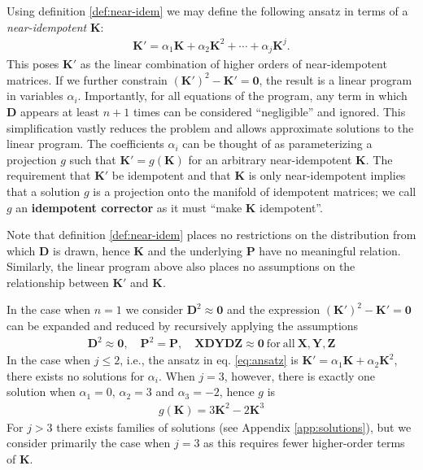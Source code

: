 \documentclass{article}
\theoremstyle{plain}
\theoremstyle{definition}
\theoremstyle{remark}
\newcommand{\vD}{\mathbf{D}}
\newcommand{\vK}{\mathbf{K}}
\newcommand{\vP}{\mathbf{P}}
\newcommand{\vX}{\mathbf{X}}
\newcommand{\vY}{\mathbf{Y}}
\newcommand{\vZ}{\mathbf{Z}}
\begin{document}
Using definition \ref{def:near-idem} we may define the following ansatz in terms of a \textit{near-idempotent} $\vK$:
%
\begin{align}
    \vK' = \alpha_1 \vK + \alpha_2 \vK^2 + \cdots + \alpha_j \vK^j.
    \label{eq:ansatz}
\end{align}
%
This poses $\vK'$ as the linear combination of higher orders of near-idempotent matrices. If we further constrain $(\vK')^2 - \vK' = \bm{0}$, the result is a linear program in variables $\alpha_i$. Importantly, for all equations of the program, any term in which $\vD$ appears at least $n+1$ times can be considered ``negligible'' and ignored. This simplification vastly reduces the problem and allows approximate solutions to the linear program. The coefficients $\alpha_i$ can be thought of as parameterizing a projection $g$ such that $\vK' = g(\vK)$ for an arbitrary near-idempotent $\vK$. The requirement that $\vK'$ be idempotent and that $\vK$ is only near-idempotent implies that a solution $g$ is a projection onto the manifold of idempotent matrices; we call $g$ an \textbf{idempotent corrector} as it must ``make $\vK$ idempotent''.

Note that definition \ref{def:near-idem} places no restrictions on the distribution from which $\vD$ is drawn, hence $\vK$ and the underlying $\vP$ have no meaningful relation. Similarly, the linear program above also places no assumptions on the relationship between $\vK'$ and $\vK$.

In the case when $n=1$ we consider $\vD^2 \approx \bm{0}$ and the expression $(\vK')^2 - \vK' = \bm{0}$ can be expanded and reduced by recursively applying the assumptions
%
\begin{align*}
    \vD^2 \approx \bm{0}, \quad \vP^2 = \vP, \quad \vX \vD \vY \vD \vZ \approx \bm{0} \mathrm{~for~all~} \vX,\vY,\vZ
\end{align*}
%
In the case when $j\leq2$, i.e., the ansatz in eq. \ref{eq:ansatz} is $\vK' = \alpha_1 \vK + \alpha_2 \vK^2$, there exists no solutions for $\alpha_i$. When $j=3$, however, there is exactly one solution when $\alpha_1 = 0$, $\alpha_2 = 3$ and $\alpha_3 = -2$, hence $g$ is
%
\begin{align}
    g(\vK) = 3\vK^2 - 2 \vK^3
    \label{eq:}
\end{align}
%
For $j>3$ there exists families of solutions (see Appendix \ref{app:solutions}), but we consider primarily the case when $j=3$ as this requires fewer higher-order terms of $\vK$.
\end{document}
